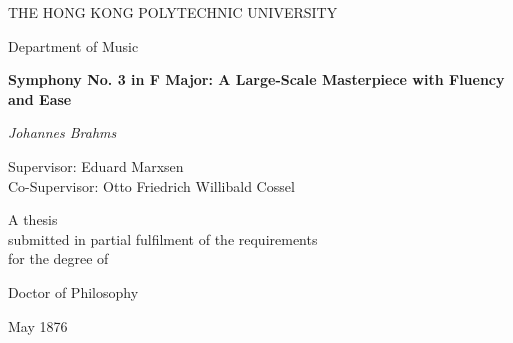 \thispagestyle{empty}

\begin{center}

\vspace*{2cm} %

{\Large THE HONG KONG POLYTECHNIC UNIVERSITY}

\vspace{1cm}
{\large Department of Music}

\vspace{2cm}
{\Large \textbf{
Symphony No. 3 in F Major: A Large-Scale Masterpiece with Fluency and Ease
}}

\vspace{2cm}
{\Large \textit{Johannes Brahms}}


\vspace{2.5cm}
{\large Supervisor: Eduard Marxsen} \\
{\large Co-Supervisor: Otto Friedrich Willibald Cossel}

\vspace{2cm}
{\large A thesis \\ submitted in partial fulfilment of the requirements \\ for the degree of}

\vspace{1cm}
{\large Doctor of Philosophy}

\vspace{2cm}
{\large May 1876}

\end{center}

